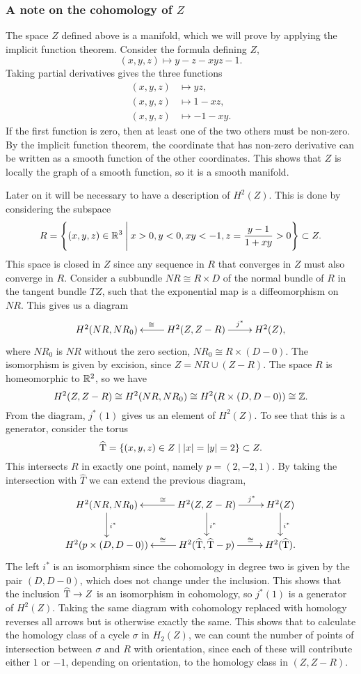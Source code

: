 \subsubsection{A note on the cohomology of $Z$}

The space $Z$ defined above is a manifold, which we will prove by
applying the implicit function theorem. Consider the formula defining
$Z$,
\[ (x,y,z) \mapsto y-z-xyz-1. \]
Taking partial derivatives gives the three functions
\begin{align*}
  (x,y,z) &\mapsto yz, \\
  (x,y,z) &\mapsto 1-xz, \\
  (x,y,z) &\mapsto -1-xy.
\end{align*}
If the first function is zero, then at least one of the two others
must be non-zero. By the implicit function theorem, the coordinate
that has non-zero derivative can be written as a smooth function of
the other coordinates. This shows that $Z$ is locally the graph of a
smooth function, so it is a smooth manifold.

Later on it will be necessary to have a description of $H^2(Z)$. This
is done by considering the subspace
\[ R = \left\{ (x,y,z) \in \mathbb{R}^3 \:\Bigg\vert\: x > 0, y < 0, xy < -1, z =
  \frac{y-1}{1+xy}>0  \right\} \subset Z. \]
This space is closed in $Z$ since any sequence in $R$ that converges
in $Z$ must also converge in $R$.
Consider a subbundle $NR \cong R\times D$ of the normal bundle of $R$
in the tangent bundle $TZ$, such that the exponential map is a
diffeomorphism on $NR$. This gives us a diagram
\[ \xymatrix{ H^2(NR,NR_0) & H^2(Z,Z-R) \ar[l]_\cong \ar[r]^>>>>>{j^*} &
  H^2(Z), } \]
where $NR_0$ is $NR$ without the zero section, $NR_0 \cong
R\times(D-0)$. The isomorphism is given by excision, since $Z = NR
\cup (Z-R)$. The space $R$ is homeomorphic to $\mathbb{R}^2$, so we have 
\[ H^2(Z,Z-R) \cong H^2(NR,NR_0) \cong H^2(R\times (D,D-0)) \cong
\mathbb{Z}. \] 
From the diagram, $j^*(1)$ gives us an element of $H^2(Z)$. To see
that this is a generator, consider the torus 
\[ \widehat {\operatorname{T}} = \left\{ (x,y,z)\in Z \mid \left| x \right| = \left| y \right| = 2  \right\}
\subset Z. \]
This intersects $R$ in exactly one point, namely $p=(2,-2,1)$. By
taking the intersection with $\widehat T$ we can extend the previous
diagram,
\[ \xymatrix{ H^2(NR,NR_0) \ar[d]^{i^*} & H^2(Z,Z-R) \ar[d]^{i^*}
  \ar[l]_<<<<<\cong \ar[r]^>>>>>{j^*} & H^2(Z) \ar[d]^{i^*} \\
  H^2(p\times (D,D-0)) & H^2(\widehat \T,\widehat \T-p)
  \ar[r]^>>>>>{\cong} \ar[l]_>>>>>\cong & H^2(\widehat \T).
} \]
The left $i^*$ is an isomorphism since the cohomology in degree two is
given by the pair $(D,D-0)$, which does not change under the
inclusion. This shows that the inclusion $\widehat {\operatorname{T}} \to Z$ is an
isomorphism in cohomology, so $j^*(1)$ is a generator of
$H^2(Z)$. Taking the same diagram with cohomology replaced with
homology reverses all arrows but is otherwise exactly the same. This
shows that to calculate the homology class of a cycle $\sigma$ in
$H_2(Z)$, we can count the number of points of intersection between
$\sigma$ and $R$ with orientation, since each of these will contribute
either $1$ or $-1$, depending on orientation, to the homology class in
$(Z,Z-R)$.

